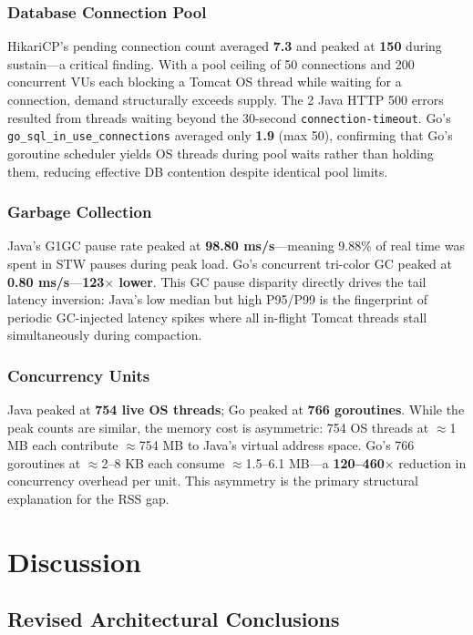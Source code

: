 \documentclass[conference]{IEEEtran}
\begin{document}
\subsubsection{Database Connection Pool}
HikariCP's pending connection count averaged \textbf{7.3} and peaked at \textbf{150} during sustain---a critical finding. With a pool ceiling of 50 connections and 200 concurrent VUs each blocking a Tomcat OS thread while waiting for a connection, demand structurally exceeds supply. The 2 Java HTTP 500 errors resulted from threads waiting beyond the 30-second \texttt{connection-timeout}. Go's \texttt{go\_sql\_in\_use\_connections} averaged only \textbf{1.9} (max 50), confirming that Go's goroutine scheduler yields OS threads during pool waits rather than holding them, reducing effective DB contention despite identical pool limits.

\subsubsection{Garbage Collection}
Java's G1GC pause rate peaked at \textbf{98.80 ms/s}---meaning 9.88\% of real time was spent in STW pauses during peak load. Go's concurrent tri-color GC peaked at \textbf{0.80 ms/s}---\textbf{123$\times$ lower}. This GC pause disparity directly drives the tail latency inversion: Java's low median but high P95/P99 is the fingerprint of periodic GC-injected latency spikes where all in-flight Tomcat threads stall simultaneously during compaction.

\subsubsection{Concurrency Units}
Java peaked at \textbf{754 live OS threads}; Go peaked at \textbf{766 goroutines}. While the peak counts are similar, the memory cost is asymmetric: 754 OS threads at $\approx$1 MB each contribute $\approx$754 MB to Java's virtual address space. Go's 766 goroutines at $\approx$2--8 KB each consume $\approx$1.5--6.1 MB---a \textbf{120--460$\times$} reduction in concurrency overhead per unit. This asymmetry is the primary structural explanation for the RSS gap.

\section{Discussion}

\subsection{Revised Architectural Conclusions}
\end{document}
